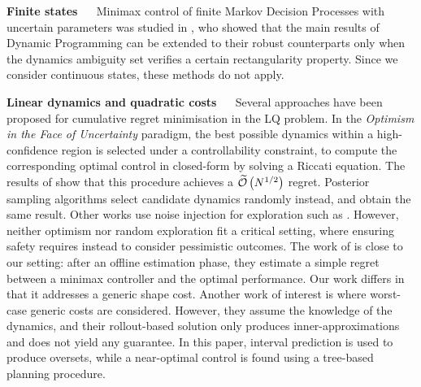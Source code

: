 \documentclass{article}
\begin{document}
\textbf{Finite states} ~~ Minimax control of finite Markov Decision Processes with uncertain parameters was studied in \citep{Iyengar2005,Nilim2005,Wiesemann2013}, who showed that the main results of Dynamic Programming can be extended to their robust counterparts only when the dynamics ambiguity set verifies a certain rectangularity property. Since we consider continuous states, these methods do not apply.

\textbf{Linear dynamics and quadratic costs} ~~ Several approaches have been proposed for cumulative regret minimisation in the LQ problem. In the \emph{Optimism in the Face of Uncertainty} paradigm, the best possible dynamics within a high-confidence region is selected under a controllability constraint, to compute the corresponding optimal control in closed-form by solving a Riccati equation. The results of 	\citep{abbasi-yadkori11a,Ibrahimi2013,Faradonbeh2017} show that this procedure achieves a $\widetilde{\mathcal{O}}\left(N^{1/2}\right)$ regret. Posterior sampling algorithms \citep{Ouyang2017,abeille18a} select candidate dynamics randomly instead, and obtain the same result. Other works use noise injection for exploration such as \citep{Dean2017,Dean2018}. However, neither optimism nor random exploration fit a critical setting, where ensuring safety requires instead to consider pessimistic outcomes. The work of \citet{Dean2017} is close to our setting: after an offline estimation phase, they estimate a simple regret between a minimax controller and the optimal performance. Our work differs in that it addresses a generic shape cost. 
Another work of interest is \citep{Rosolia2019} where worst-case generic costs are considered. However, they assume the knowledge of the dynamics, and their rollout-based solution only produces inner-approximations and does not yield any guarantee. In this paper, interval prediction is used to produce oversets, while a near-optimal control is found using a tree-based planning procedure.
\end{document}
